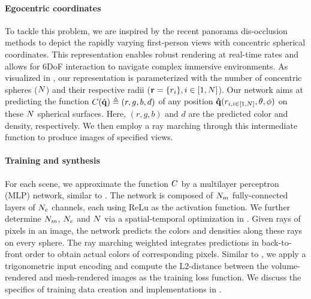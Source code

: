 \paragraph{Egocentric coordinates}
To tackle this problem, we are inspired by the recent panorama dis-occlusion methods \cite{Lin:DeepPanorama,Benjamin:2020:RTV,Broxton:immersiveLF} to depict the rapidly varying first-person views with concentric spherical coordinates. This representation enables robust rendering at real-time rates and allows for 6DoF interaction to navigate complex immersive environments. 
As visualized in , our representation is parameterized with the number of concentric spheres ($N$) and their respective radii ($\mathbf{r}=\{r_i\},i\in [1,N]$). Our network aims at predicting the function $C(\hat{\mathbf{q}})\triangleq(r,g,b,d)$ of any position $\mathbf{\hat{\mathbf{q}}}({r_{i,i\in[1,N]},\theta,\phi})$ on these $N$ spherical surfaces. %
Here, $(r,g,b)$ and $d$ are the predicted color and density, respectively. 
We then employ a ray marching through this intermediate function to produce images of specified views.

\paragraph{Training and synthesis}
For each scene, we approximate the function $C$ by a multilayer perceptron (MLP) network, similar to \cite{mildenhall2020nerf}.
The network is composed of $N_{m}$ fully-connected layers of $N_{c}$ channels, each using ReLu as the activation function. We further determine $N_{m}$, $N_{c}$ and $N$ via a spatial-temporal optimization in .
Given rays of pixels in an image, the network predicts the colors and densities along these rays on every sphere. The ray marching weighted integrates predictions in back-to-front order to obtain actual colors of corresponding pixels.%
Similar to \cite{mildenhall2020nerf}, we apply a trigonometric input encoding and compute the L2-distance between the volume-rendered and mesh-rendered images as the training loss function. We discuss the specifics of training data creation and implementations in .

